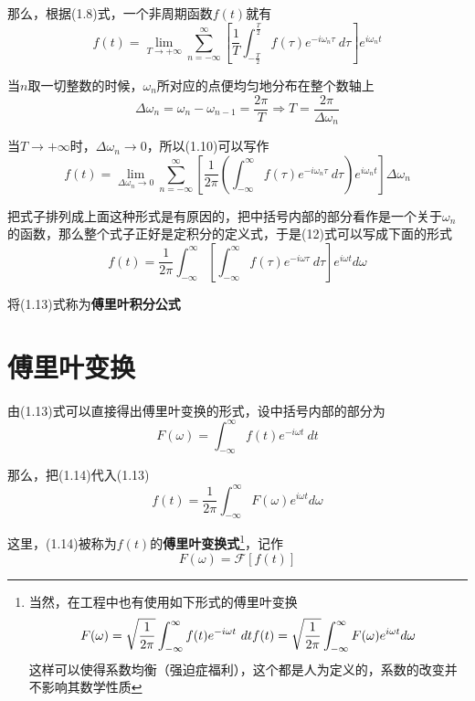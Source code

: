 \documentclass[UTF8]{ctexbook}
\begin{document}
			那么，根据(1.8)式，一个非周期函数$f(t)$就有
			\begin{equation}
				f(t)=\lim_{T\to +\infty}\sum\limits_{n=-\infty}^{\infty}\left[\dfrac{1}{T}\int_{-\frac{T}{2}}^{\frac{T}{2}}f(\tau)e^{-i\omega_n \tau}\ d\tau\right] e^{i\omega_n t}
			\end{equation}

			当$n$取一切整数的时候，$\omega_n$所对应的点便均匀地分布在整个数轴上
			\begin{equation}
				\Delta\omega_n=\omega_n-\omega_{n - 1}=\dfrac{2\pi}{T}\Rightarrow T=\dfrac{2\pi}{\Delta\omega_n}
			\end{equation}
			
			当$T\to +\infty$时，$\Delta\omega_n\to 0$，所以(1.10)可以写作
			\begin{equation}
				f(t)=\lim_{\Delta\omega_n\to 0}\sum\limits_{n=-\infty}^{\infty}\left[\dfrac{1}{2\pi}\left(\int_{-\infty}^{\infty}f(\tau)e^{-i\omega_n \tau}\ d\tau\right)e^{i\omega_n t}\right] \Delta\omega_n
			\end{equation}
			
			把式子排列成上面这种形式是有原因的，把中括号内部的部分看作是一个关于$\omega_n$的函数，那么整个式子正好是定积分的定义式，于是(12)式可以写成下面的形式
			\begin{equation}
				f(t)=\dfrac{1}{2\pi}\int_{-\infty}^{\infty}\left[\int_{-\infty}^{\infty}f(\tau)e^{-i\omega \tau}\ d\tau\right] e^{i\omega t} d\omega
			\end{equation}
			
			将(1.13)式称为\textbf{傅里叶积分公式}

		\section{傅里叶变换}

			由(1.13)式可以直接得出傅里叶变换的形式，设中括号内部的部分为
			\begin{equation}
				F(\omega)=\int_{-\infty}^{\infty}f(t)e^{-i\omega t}\ dt
			\end{equation}

			那么，把(1.14)代入(1.13)
			\begin{equation}
				f(t)=\dfrac{1}{2\pi}\int_{-\infty}^{\infty}F(\omega) e^{i\omega t} d\omega
			\end{equation}

			这里，(1.14)被称为$f(t)$的\textbf{傅里叶变换式}\footnote{当然，在工程中也有使用如下形式的傅里叶变换
				$$
				F(\omega)=\sqrt{\dfrac{1}{2\pi}}\int_{-\infty}^{\infty}f(t)e^{-i\omega t}\ dt\\
				f(t)=\sqrt{\dfrac{1}{2\pi}}\int_{-\infty}^{\infty}F(\omega) e^{i\omega t} d\omega
				$$
				这样可以使得系数均衡（强迫症福利），这个都是人为定义的，系数的改变并不影响其数学性质}，记作
			\begin{equation}
				F(\omega)=\mathscr{F}[f(t)]
			\end{equation}
\end{document}

